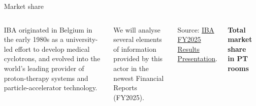 \documentclass[aspectratio=169,11pt]{beamer}
\begin{document}
\begin{frame}{Market share}

\vspace{0.1cm}

\begin{columns}[T,onlytextwidth]



{\small
IBA originated in Belgium in the early 1980s as a university-led effort to develop medical cyclotrons, and evolved into the world's leading provider of proton-therapy systems and particle-accelerator technology.
}

\vspace{0.50cm}

\small{
We will analyse several elements of information provided by this actor in the newest Financial Reports (FY2025).}
\vspace{0.50cm}

{\scriptsize
Source:
\href{https://www.iba-worldwide.com/sites/default/files/2026-03/iba-fy25-results-presentation-en.pdf}
{IBA FY2025 Results Presentation}.
}


\centering

{\large\bfseries Total market share in PT rooms}

\vspace{0.18cm}

\end{columns}
\end{frame}
\end{document}
